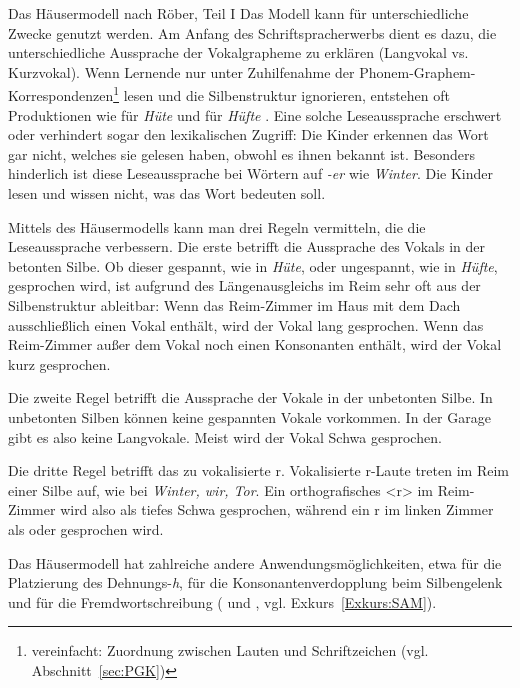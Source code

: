 \begin{Exkurs}{Das Häusermodell nach Röber, Teil I}
Das Modell kann für unterschiedliche Zwecke genutzt werden. Am Anfang des Schriftspracherwerbs dient es dazu, die unterschiedliche Aussprache der Vokalgrapheme zu erklären (Langvokal vs. Kurzvokal). Wenn Lernende nur unter Zuhilfenahme der Phonem-Graphem-Korrespondenzen\footnote{vereinfacht: Zuordnung zwischen Lauten und Schriftzeichen (vgl. Abschnitt~\ref{sec:PGK})} lesen und die Silbenstruktur ignorieren, entstehen oft Produktionen wie  für \textit{Hüte} und  für \textit{Hüfte} \citep[135]{Roeber2013}. Eine solche Leseaussprache erschwert oder verhindert sogar den lexikalischen Zugriff: Die Kinder erkennen das Wort gar nicht, welches sie gelesen haben, obwohl es ihnen bekannt ist. Besonders hinderlich ist diese Leseaussprache bei Wörtern auf \textit{-er} wie \textit{Winter}. Die Kinder lesen  und wissen nicht, was das Wort bedeuten soll.

Mittels des Häusermodells kann man drei Regeln vermitteln, die die Leseaussprache verbessern. Die erste betrifft die Aussprache des Vokals in der betonten Silbe. Ob dieser gespannt, wie in \textit{Hüte}, oder ungespannt, wie in \textit{Hüfte}, gesprochen wird, ist aufgrund des Längenausgleichs im Reim sehr oft aus der Silbenstruktur ableitbar: Wenn das Reim-Zimmer im Haus mit dem Dach ausschließlich einen Vokal enthält, wird der Vokal lang gesprochen. Wenn das Reim-Zimmer außer dem Vokal noch einen Konsonanten enthält, wird der Vokal kurz gesprochen.

Die zweite Regel betrifft die Aussprache der Vokale in der unbetonten Silbe. In unbetonten Silben können keine gespannten Vokale vorkommen. In der Garage gibt es also keine Langvokale. Meist wird der Vokal Schwa gesprochen.

Die dritte Regel betrifft das zu \textipa{[5]} vokalisierte r. Vokalisierte r-Laute treten im Reim einer Silbe auf, wie bei \textit{Winter, wir, Tor}. Ein orthografisches <r> im Reim-Zimmer wird also als tiefes Schwa gesprochen, während ein r im linken Zimmer als \textipa{[K, r]} oder \textipa{[\;R]}  gesprochen wird.

Das Häusermodell hat zahlreiche andere Anwendungsmöglichkeiten, etwa für die Platzierung des Dehnungs-\textit{h}, für die Konsonantenverdopplung beim Silbengelenk und für die Fremdwortschreibung (\cite{Bredel2011} und \cite{Roeber2013}, vgl. Exkurs~\ref{Exkurs:SAM}).


\end{Exkurs}

